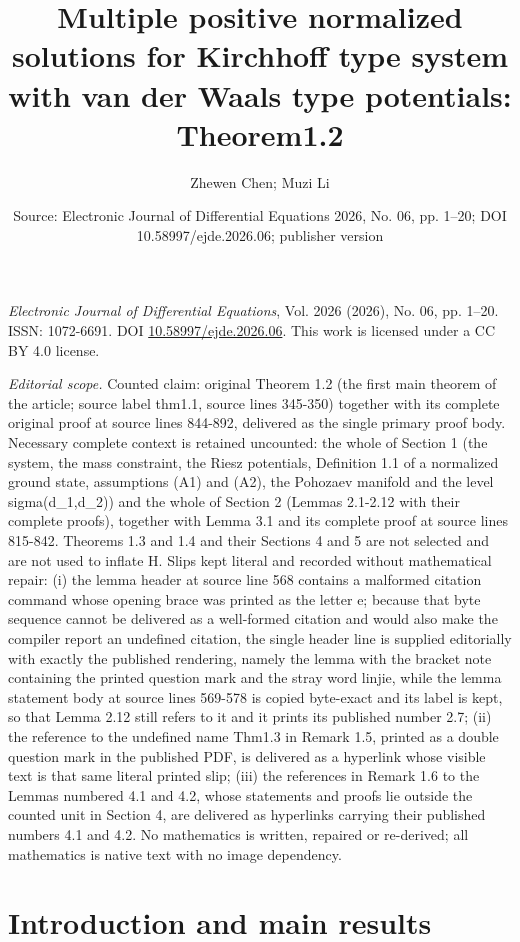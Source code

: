 \documentclass[10pt,a4paper]{amsart}
\title[Multiple positive normalized solutions for Kirchhoff type sy]{Multiple positive normalized solutions for Kirchhoff type system with van der Waals type potentials: Theorem1.2}
\author{Zhewen Chen; Muzi Li}
\date{Source: Electronic Journal of Differential Equations 2026, No. 06, pp. 1--20; DOI 10.58997/ejde.2026.06; publisher version}
\numberwithin{equation}{section}
\begin{document}
\maketitle
\noindent\emph{Electronic Journal of Differential Equations}, Vol. 2026 (2026), No. 06, pp. 1--20.\newline
ISSN: 1072-6691. DOI \href{https://doi.org/10.58997/ejde.2026.06}{10.58997/ejde.2026.06}. This work is licensed under a CC BY 4.0 license.\par\smallskip
\noindent\textit{Editorial scope.} Counted claim: original Theorem 1.2 (the first main theorem of the article; source label thm1.1, source lines 345-350) together with its complete original proof at source lines 844-892, delivered as the single primary proof body. Necessary complete context is retained uncounted: the whole of Section 1 (the system, the mass constraint, the Riesz potentials, Definition 1.1 of a normalized ground state, assumptions (A1) and (A2), the Pohozaev manifold and the level sigma(d\_1,d\_2)) and the whole of Section 2 (Lemmas 2.1-2.12 with their complete proofs), together with Lemma 3.1 and its complete proof at source lines 815-842. Theorems 1.3 and 1.4 and their Sections 4 and 5 are not selected and are not used to inflate H. Slips kept literal and recorded without mathematical repair: (i) the lemma header at source line 568 contains a malformed citation command whose opening brace was printed as the letter e; because that byte sequence cannot be delivered as a well-formed citation and would also make the compiler report an undefined citation, the single header line is supplied editorially with exactly the published rendering, namely the lemma with the bracket note containing the printed question mark and the stray word linjie, while the lemma statement body at source lines 569-578 is copied byte-exact and its label is kept, so that Lemma 2.12 still refers to it and it prints its published number 2.7; (ii) the reference to the undefined name Thm1.3 in Remark 1.5, printed as a double question mark in the published PDF, is delivered as a hyperlink whose visible text is that same literal printed slip; (iii) the references in Remark 1.6 to the Lemmas numbered 4.1 and 4.2, whose statements and proofs lie outside the counted unit in Section 4, are delivered as hyperlinks carrying their published numbers 4.1 and 4.2. No mathematics is written, repaired or re-derived; all mathematics is native text with no image dependency.
\section{Introduction and main results}
\end{document}
